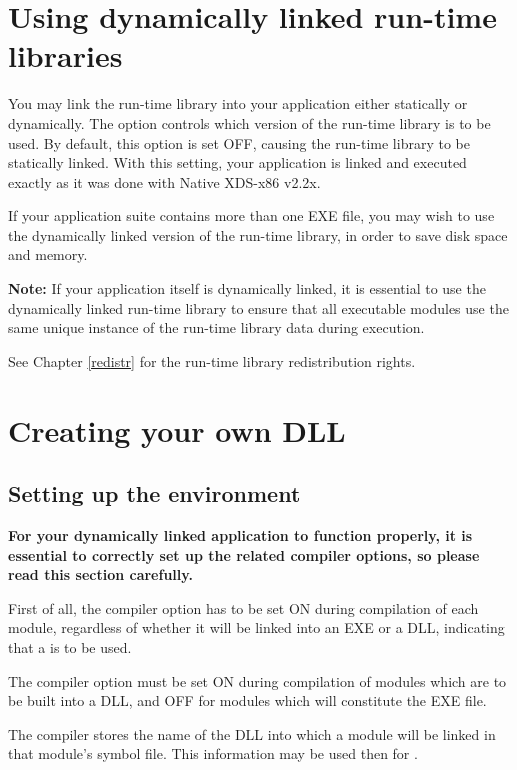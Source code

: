 \section{Using dynamically linked run-time libraries}
\label{dll:runtime}

You may link the \XDS{} run-time library into your application
either statically or dynamically. The  option controls
which version of the run-time library is to be used.
By default, this option is set OFF, causing the run-time library to
be statically linked. With this setting, your application is linked
and executed exactly as it was done with Native XDS-x86 v2.2x.

If your application suite contains more than one EXE file, you may wish to
use the dynamically linked version of the run-time library, in order to
save disk space and memory.

{\bf Note:} If your application itself is dynamically linked,
it is essential to use the dynamically linked run-time library to ensure that
all executable modules use the same unique instance of the run-time library
data during execution.

See Chapter \ref{redistr} for the run-time library redistribution rights.

\section{Creating your own DLL}
\label{dll:create}

\subsection{Setting up the environment}
\label{dll:create:env}

{\bf
For your dynamically linked application to function properly,
it is essential to correctly set up the related compiler options,
so please read this section carefully.
}

First of all, the  compiler option has to be set ON
during compilation of each module, regardless of whether it
will be linked into an EXE or a DLL, indicating that a
is to be used.

The  compiler option must be set ON during compilation
of modules which are to be built into a DLL, and OFF for modules
which will constitute the EXE file.

The compiler stores the name of the DLL into which a
module will be linked in that module's symbol file. This information may be used
then for .

